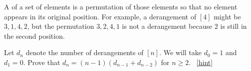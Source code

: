 \documentclass{book}
\begin{document}
\setcounter{project}{100}
\addtocounter{project}{-1}
\begin{activity}[]\label{activity-93}
\hypertarget{p-742}{}%
A  of a set of elements is a permutation of those elements so that no element appears in its original position.  For example, a derangement of \([4]\) might be \(3,1,4,2\), but the permutation \(3,2,4,1\) is not a derangement because \(2\) is still in the second position.%
\par
\hypertarget{p-743}{}%
Let \(d_{n}\) denote the number of derangements of \([n]\).  We will take \(d_{0} = 1\) and \(d_{1} = 0\).  Prove that \(d_{n} = (n - 1)(d_{n - 1}+ d_{n - 2})\) for \(n \geq 2\).%
~\hfill{\tiny\hyperlink{a-100}{[hint]}\hypertarget{q-100}{}}\end{activity}
\end{document}
